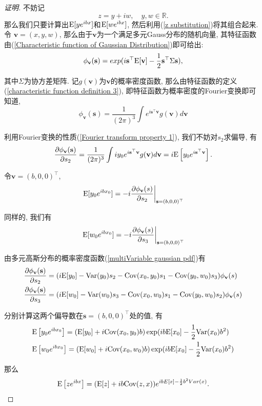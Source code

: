 \documentclass[notitlepage,cs4size,punct,oneside]{ctexrep}
\numberwithin{equation}{section}
\theoremstyle{mystyle}
\begin{document}
\begin{proof}[证明]
不妨记
$$z = y + iw, \quad y, w\in \mathbb{R}. \label{z substitution}$$
那么我们只要计算出$\text{E}[ye^{ibx}]$和$\text{E}[we^{ibx}]$, 然后利用(\ref{z substitution})将其组合起来. 令
$\textbf{v} = (x, y, w)$, 那么由于$\textbf{v}$为一个满足多元Gauss分布的随机向量, 其特征函数由(\ref{Characteristic function of Gaussian Distribution})即可给出:
\[
\phi_\textbf{v}(\textbf{s}) = exp(i\textbf{s}^\top \text{E}[\textbf{v}]-\frac{1}{2}\textbf{s}^\top\Sigma\textbf{s}),
\]

其中$\Sigma$为协方差矩阵. 记$g(\textbf{v})$为$\textbf{v}$的概率密度函数, 那么由特征函数的定义(\ref{characteristic function definition 3}), 即特征函数为概率密度的Fourier变换即可知道,
\[
\phi_\textbf{v}(\textbf{s}) = \frac{1}{(2\pi)^3}\int e^{i\textbf{s}^\top\textbf{v}}g(\textbf{v})d\textbf{v}
\]

利用Fourier变换的性质(\ref{Fourier transform property 1}), 我们不妨对$s_2$求偏导\cite{gershgorin2008nonlinear}, 有
\[
\frac{\partial \phi_\textbf{v}(\textbf{s})}{\partial s_2} = \frac{1}{(2\pi)^3}\int iy_0e^{i\textbf{s}^\top\textbf{v}}g(\textbf{v})d\textbf{v} = i\text{E}\left[y_0e^{i\textbf{s}^\top\textbf{v}}\right].
\]

令$\textbf{v} = (b, 0, 0)^\top$,
\[
\left.\text{E}[y_0e^{ibx_0}] = -i\frac{\partial \phi_\textbf{v}(s)}{\partial s_2}\right|_{\textbf{s} = (b, 0, 0)^\top}
\]

同样的, 我们有
\[
\left.\text{E}[w_0e^{ibx_0}] = -i\frac{\partial \phi_\textbf{v}(s)}{\partial s_3}\right|_{\textbf{s} = (b, 0, 0)^\top}
\]

由多元高斯分布的概率密度函数(\ref{multiVariable gaussian pdf})有
\[
\begin{split}
&\frac{\partial \phi_\textbf{v}(\textbf{s})}{\partial s_2} = (i\text{E}[y_0]-\text{Var}(y_0)s_2-\text{Cov}(x_0, y_0)s_1-\text{Cov}(y_0, w_0)s_3)\phi_{\textbf{v}}(s) \\
&\frac{\partial \phi_\textbf{v}(\textbf{s})}{\partial s_3} = (i\text{E}[w_0]-\text{Var}(w_0)s_3-\text{Cov}(x_0, w_0)s_1-\text{Cov}(y_0, w_0)s_2)\phi_{\textbf{v}}(s)
\end{split}
\]

分别计算这两个偏导数在$\textbf{s} = (b, 0, 0)^\top$处的值, 有
\[
\begin{split}
&\text{E}\left[y_0e^{ibx_0}\right] = (\text{E}[y_0]+i\text{Cov}(x_0, y_0)b)\exp(ib\text{E}[x_0] - \frac{1}{2}\text{Var}(x_0)b^2) \\
&\text{E}\left[w_0e^{ibx_0}\right] = (\text{E}[w_0]+i\text{Cov}(x_0, w_0)b)\exp(ib\text{E}[x_0] - \frac{1}{2}\text{Var}(x_0)b^2)
\end{split}
\]

那么
$$\text{E}\left[ze^{ibx}\right] = (\text{E}[z]+ib\text{Cov}(z, x))e^{ibE[x]-\frac{1}{2}b^2Var(x)}.$$
\end{proof}
\end{document}

